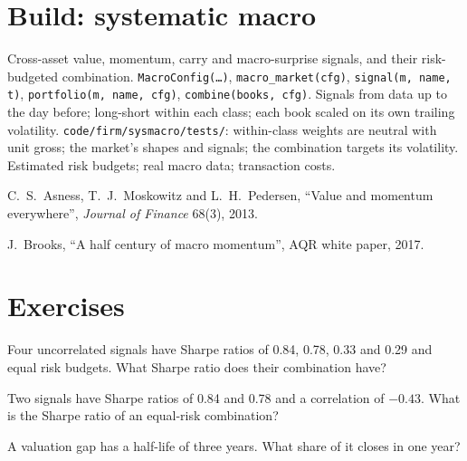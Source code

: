 \section{Build: systematic macro}\label{bld:s2:systematic-macro:sysmacro}

\begin{build}
 Cross-asset value, momentum, carry and macro-surprise signals, and their risk-budgeted combination.
 \texttt{MacroConfig(\dots)}, \texttt{macro\_market(cfg)}, \texttt{signal(m, name, t)}, \texttt{portfolio(m, name, cfg)},
\texttt{combine(books, cfg)}.
 Signals from data up to the day before; long-short within each class; each book scaled on its own trailing volatility.
 \texttt{code/firm/sysmacro/tests/}: within-class weights are neutral with unit gross; the market's shapes and signals; the
combination targets its volatility.
 Estimated risk budgets; real macro data; transaction costs.
\end{build}

\begin{omsources}
\item C.~S.~Asness, T.~J.~Moskowitz and L.~H.~Pedersen, ``Value and momentum everywhere'', \emph{Journal of Finance} 68(3), 2013.
\item J.~Brooks, ``A half century of macro momentum'', AQR white paper, 2017.
\end{omsources}

\section{Exercises}

\begin{exercise}[$\star$]\label{exo:s2:systematic-macro:1}
Four uncorrelated signals have Sharpe ratios of 0.84, 0.78, 0.33 and 0.29 and equal risk budgets. What Sharpe ratio does their combination have?
\end{exercise}

\begin{exercise}[$\star$]\label{exo:s2:systematic-macro:2}
Two signals have Sharpe ratios of 0.84 and 0.78 and a correlation of $-0.43$. What is the Sharpe ratio of an equal-risk combination?
\end{exercise}

\begin{exercise}[$\star$]\label{exo:s2:systematic-macro:3}
A valuation gap has a half-life of three years. What share of it closes in one year?
\end{exercise}

